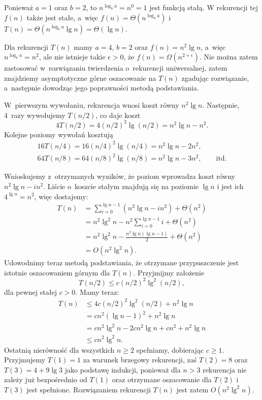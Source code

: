 \exercise %
Ponieważ $a=1$ oraz $b=2$, to $n^{\log_ba}=n^0=1$ jest funkcją stałą. W rekurencji tej $f(n)$ także jest stałe, a~więc $f(n)=\Theta(n^{\log_ba})$ i~$T(n)=\Theta(n^{\log_ba}\lg n)=\Theta(\lg n)$.

\exercise %
Dla rekurencji $T(n)$ mamy $a=4$, $b=2$ oraz $f(n)=n^2\lg n$, a~więc $n^{\log_ba}=n^2$, ale nie istnieje takie $\epsilon>0$, że $f(n)=\Omega(n^{2+\epsilon})$. Nie można zatem zastosować w~rozwiązaniu twierdzenia o~rekurencji uniwersalnej, zatem znajdziemy asymptotyczne górne oszacowanie na $T(n)$ zgadując rozwiązanie, a~następnie dowodząc jego poprawności metodą podstawiania.

W~pierwszym wywołaniu, rekurencja wnosi koszt równy $n^2\lg n$. Następnie, 4~razy wywołujemy $T(n/2)$, co daje koszt
\[
	4T(n/2) = 4(n/2)^2\lg(n/2) = n^2\lg n-n^2.
\]
Kolejne poziomy wywołań kosztują
\begin{gather*}
	16T(n/4) = 16(n/4)^2\lg(n/4) = n^2\lg n-2n^2, \qquad\phantom{\text{itd.}} \\
	64T(n/8) = 64(n/8)^2\lg(n/8) = n^2\lg n-3n^2, \qquad\text{itd.}
\end{gather*}

Wnioskujemy z~otrzymanych wyników, że  poziom wprowadza koszt równy $n^2\lg n-in^2$. Liście o~koszcie stałym znajdują się na poziomie $\lg n$ i jest ich $4^{\lg n}=n^2$, więc dostajemy:
\begin{align*}
	T(n) &= \sum_{i=0}^{\lg n-1}(n^2\lg n-in^2)+\Theta(n^2) \\
	&= n^2\lg^2n-n^2\sum_{i=0}^{\lg n-1}i+\Theta(n^2) \\[1mm]
	&= n^2\lg^2n-\frac{n^2\lg n(\lg n-1)}{2}+\Theta(n^2) \\[1mm]
	&= O(n^2\lg^2n).
\end{align*}
Udowodnimy teraz metodą podstawiania, że otrzymane przypuszczenie jest istotnie oszacowaniem górnym dla $T(n)$. Przyjmijmy założenie
\[
	T(n/2) \le c(n/2)^2\lg^2(n/2),
\]
dla pewnej stałej $c>0$. Mamy teraz:
\begin{align*}
	T(n) &\le 4c(n/2)^2\lg^2(n/2)+n^2\lg n \\
	&= cn^2(\lg n-1)^2+n^2\lg n \\
	&= cn^2\lg^2n-2cn^2\lg n+cn^2+n^2\lg n \\
	&\le cn^2\lg^2n.
\end{align*}
Ostatnią nierówność dla wszystkich $n\ge2$ spełniamy, dobierając $c\ge1$. Przyjmujemy $T(1)=1$ za warunek brzegowy rekurencji, zaś $T(2)=8$ oraz $T(3)=4+9\lg3$ jako podstawę indukcji, ponieważ dla $n>3$ rekurencja nie zależy już bezpośrednio od $T(1)$ oraz otrzymane oszacowanie dla $T(2)$ i~$T(3)$ jest spełnione. Rozwiązaniem rekurencji $T(n)$ jest zatem $O(n^2\lg^2n)$.

